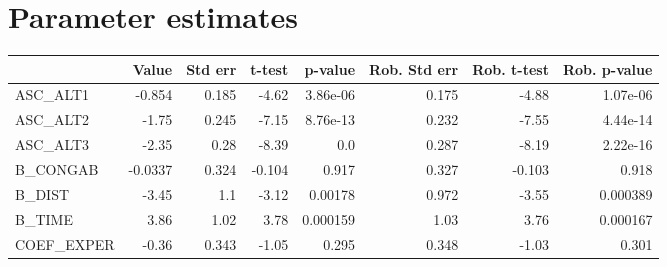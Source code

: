 \section{Parameter estimates}
\begin{tabular}{lrrrrrrr}
\toprule
{} &   Value &  Std err &  t-test &  p-value &  Rob. Std err &  Rob. t-test &  Rob. p-value \\
\midrule
ASC\_ALT1   &  -0.854 &    0.185 &   -4.62 & 3.86e-06 &         0.175 &        -4.88 &      1.07e-06 \\
ASC\_ALT2   &   -1.75 &    0.245 &   -7.15 & 8.76e-13 &         0.232 &        -7.55 &      4.44e-14 \\
ASC\_ALT3   &   -2.35 &     0.28 &   -8.39 &      0.0 &         0.287 &        -8.19 &      2.22e-16 \\
B\_CONGAB   & -0.0337 &    0.324 &  -0.104 &    0.917 &         0.327 &       -0.103 &         0.918 \\
B\_DIST     &   -3.45 &      1.1 &   -3.12 &  0.00178 &         0.972 &        -3.55 &      0.000389 \\
B\_TIME     &    3.86 &     1.02 &    3.78 & 0.000159 &          1.03 &         3.76 &      0.000167 \\
COEF\_EXPER &   -0.36 &    0.343 &   -1.05 &    0.295 &         0.348 &        -1.03 &         0.301 \\
\bottomrule
\end{tabular}

